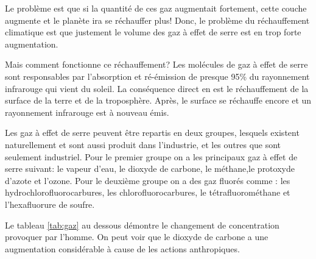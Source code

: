 \documentclass[a4paper,10pt]{article}
\begin{document}
Le problème est que si la quantité de ces gaz augmentait fortement, cette couche
augmente et le planète ira se réchauffer plus! 
Donc, le  problème du réchauffement climatique  est que justement  le volume des
gaz à effet de serre est en trop forte augmentation.

Mais comment fonctionne ce réchauffement? Les molécules de gaz à effet de serre sont responsables par l'absorption et
ré-émission de presque 95\% du rayonnement infrarouge qui vient du soleil.  La conséquence direct en est le réchauffement de la
surface de la terre et de la troposphère. Après, le surface se réchauffe encore et un
rayonnement infrarouge est à nouveau émis. 





Les  gaz à  effet  de serre  peuvent  être repartis  en  deux groupes,  lesquels
existent naturellement et sont aussi produit dans l'industrie, et les outres que
sont seulement industriel.
Pour le premier groupe on a les principaux gaz à effet de serre suivant:
le vapeur d'eau, le dioxyde de carbone, le méthane,le protoxyde d'azote et l'ozone.
Pour le deuxième groupe on a des gaz fluorés comme :
les hydrochlorofluorocarbures, 
les chlorofluorocarbures, 
le tétrafluorométhane et
l'hexafluorure de soufre.

Le  tableau \ref{tab:gaz}  au dessous  démontre le  changement  de concentration
provoquer par l'homme. On peut voir que le dioxyde de carbone a une augmentation
considérable à cause de les actions anthropiques. 
\end{document}
